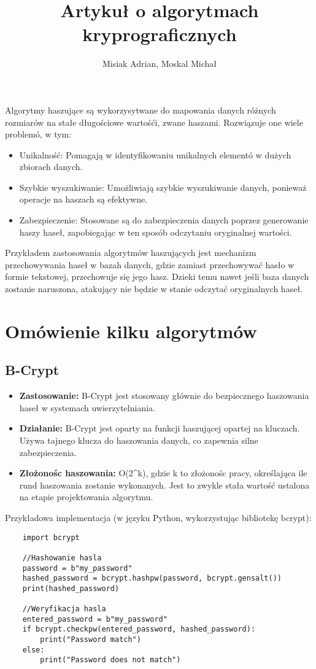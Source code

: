 \documentclass[options]{article}
\title{Artykuł o algorytmach kryprograficznych}
\author{Misiak Adrian, Moskal Michał}
\date{}
\begin{document}
\maketitle


Algorytmy haszujące są wykorzysytwane do mapowania danych różnych rozmiarów na stałe długościowe wartośći, zwane haszami. Rozwiązuje one wiele problemó, w tym:

\begin{itemize}
    \item Unikalność: Pomagają w identyfikowaniu unikalnych elementó w dużych zbiorach danych.
    \item Szybkie wyszukiwanie: Umożliwiają szybkie wyszukiwanie danych, ponieważ operacje na haszach są efektywne.
    \item Zabezpieczenie: Stosowane są do zabezpieczenia danych poprzez generowanie haszy haseł, zapobiegając w ten sposób odczytaniu oryginalnej wartości.
\end{itemize}

Przykładem zastosowania algorytmów haszujących jest mechanizm przechowywania haseł w bazah danych, gdzie zamiast przechowywać hasło w formie tekstowej, przechowuje się jego hasz. Dzieki temu nawet jeśli baza danych zostanie naruszona, atakujący nie będzie w stanie odczytać oryginalnych haseł.

\section*{Omówienie kilku algorytmów}

\subsection*{B-Crypt}
\begin{itemize}
    \item  \textbf{Zastosowanie:} B-Crypt jest stosowany głównie do bezpiecznego haszowania haseł w systemach uwierzytelniania.
    \item \textbf{Działanie:} B-Crypt jest oparty na funkcji haszującej opartej na kluczach. Używa tajnego klucza do haszowania danych, co zapewnia silne zabezpieczenia.
    \item  \textbf{Złożonośc haszowania:} O(2^k), gdzie k to złożonośc pracy, określająca ile rund haszowania zostanie wykonanych. Jest to zwykle stała wartość ustalona na etapie projektowania algorytmu.

\end{itemize}
    Przykładowa implementacja (w języku Python, wykorzystując bibliotekę bcrypt):
\begin{verbatim}
    import bcrypt

    //Hashowanie hasla
    password = b"my_password"
    hashed_password = bcrypt.hashpw(password, bcrypt.gensalt())
    print(hashed_password)

    //Weryfikacja hasla
    entered_password = b"my_password"
    if bcrypt.checkpw(entered_password, hashed_password):
        print("Password match")
    else:
        print("Password does not match")
\end{verbatim}
    
\end{document}
